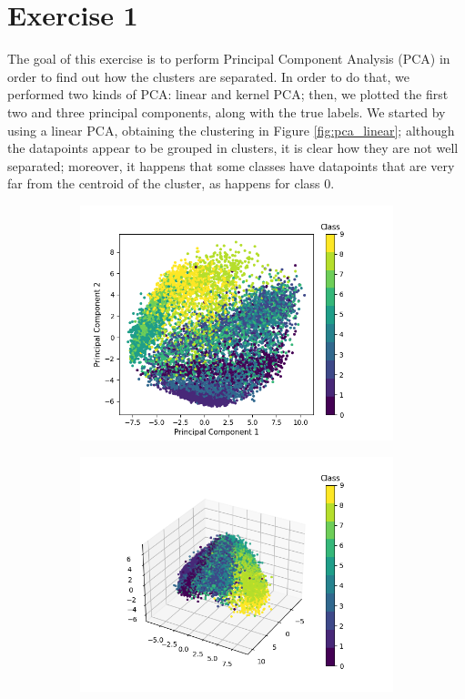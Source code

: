 \documentclass[12pt]{article}
\begin{document}
\section{Exercise 1}
The goal of this exercise is to perform Principal Component Analysis (PCA) in order to find out how the clusters are separated. In order to do that, we performed two kinds of PCA: linear and kernel PCA; then, we plotted the first two and three principal components, along with the true labels.\newline
We started by using a linear PCA, obtaining the clustering in Figure \ref{fig:pca_linear}; although the datapoints appear to be grouped in clusters, it is clear how they are not well separated; moreover, it happens that some classes have datapoints that are very far from the centroid of the cluster, as happens for class 0.
\begin{figure}[h]
	\begin{subfigure}{0.5\textwidth}
		\includegraphics[width=0.4\textheight]{pca_linear_2comps.png}
		\label{fig:pca_linear_2comps}
	\end{subfigure}
	\begin{subfigure}{0.5\textwidth}
		\includegraphics[width=0.4\textheight]{pca_linear_3comps.png}

\end{subfigure}
\end{figure}
\end{document}

